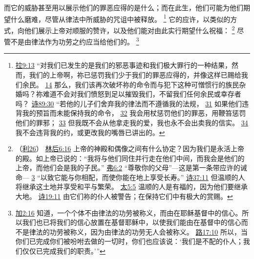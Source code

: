 \documentclass[12pt, a4paper, oneside]{ctexart}
\begin{document}
	而它的威胁甚至用以展示他们的罪恶应得的是什么；而在此生，他们可能为他们期望什么磨难，尽管从律法中所威胁的咒诅中被释放。
	\footnote {
		\href{https://biblehub.com/ezra/9-13.htm}{拉9:13} “对我们已发生的是我们的邪恶事迹和我们极大罪行的一种结果，然而，我们的上帝啊，祢已惩罚我们少于我们的罪恶应得的，并像这样已赐给我们余民。
		\href{https://biblehub.com/ezra/9-14.htm}{14} 那么，我们该再次破坏祢的命令而与犯下这种可憎惯行的族民杂婚吗？祢难道不会对我们愤怒到足以摧毁我们，不留我们任何余民或幸存者吗？
		\href{https://biblehub.com/psalms/89-30.htm}{诗89:30} “若他的儿子们舍弃我的律法而不遵循我的法规，
		\href{https://biblehub.com/psalms/89-31.htm}{31} 如果他们违背我的预旨而未能保持我的命令，
		\href{https://biblehub.com/psalms/89-32.htm}{32} 我会用杖惩罚他们的罪恶，用鞭笞惩罚他们的罪邪；
		\href{https://biblehub.com/psalms/89-33.htm}{33} 但我既不会从他拿走我的爱，我也永不会出卖我的信实。
		\href{https://biblehub.com/psalms/89-34.htm}{34} 我不会违背我的约，或更改我的嘴唇已讲出的。
	}
	它的应许，以类似的方式，向他们展示上帝对顺服的赞许，以及他们能对由此实行期望什么祝福：
	\footnote {
		（\href{https://biblehub.com/niv/leviticus/26.htm}{利26}）
		\href{https://biblehub.com/2_corinthians/6-16.htm}{林后6:16} 上帝的神殿和偶像之间有什么协定？因为我们是永活上帝的殿。如上帝已说的：“我将与他们同住并行走在他们中间，而我会是他们的上帝，而他们会是我的子民。”
		\href{https://biblehub.com/ephesians/6-2.htm}{弗6:2} “尊敬你的父母”---这是第一条带应许的诫命---
		\href{https://biblehub.com/ephesians/6-3.htm}{3} “以致它能与你相配，而使你能在地上享受长寿。”
		\href{https://biblehub.com/psalms/37-11.htm}{诗37:11} 但温顺的人将继承这土地并享受和平与繁荣。
		\href{https://biblehub.com/matthew/5-5.htm}{太5:5} 温顺的人是有福的，因为他们要继承大地。
		\href{https://biblehub.com/psalms/19-11.htm}{诗19:11} 由它们祢的仆人被警告；在保持它们中有极大的赏赐。
	}
	尽管不是由律法作为功劳之约应当给他们的。
	\footnote {
		\href{https://biblehub.com/galatians/2-16.htm}{加2:16} 知道，一个个体不由律法的功劳被称义，而由在耶稣基督中的信心。所以我们也已将我们的信心放置在基督耶稣中，以使我们能由在基督中的信心而不是律法的功劳被称义，因为由律法的功劳无人会被称义。
		\href{https://biblehub.com/luke/17-10.htm}{路17:10} 所以，当你们已完成你们被吩咐去做的一切时，你们也应该说：‘我们是不配的仆人；我们仅仅已完成我们的职责。’”
	}
\end{document}
